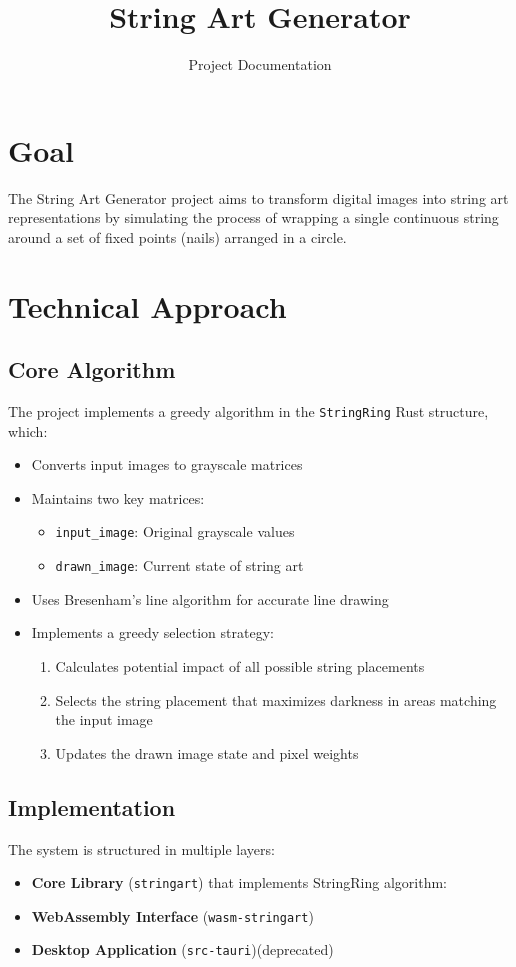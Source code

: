 \documentclass[11pt]{article}
\title{\vspace{-1.5cm}String Art Generator}
\author{Project Documentation}
\begin{document}
\maketitle

\section{Goal}
The String Art Generator project aims to transform digital images into string art representations by simulating the process of wrapping a single continuous string around a set of fixed points (nails) arranged in a circle.

\section{Technical Approach}

\subsection{Core Algorithm}
The project implements a greedy algorithm in the \texttt{StringRing} Rust structure, which:
\begin{itemize}
    \item Converts input images to grayscale matrices
    \item Maintains two key matrices:
        \begin{itemize}
            \item \texttt{input\_image}: Original grayscale values
            \item \texttt{drawn\_image}: Current state of string art
        \end{itemize}
    \item Uses Bresenham's line algorithm for accurate line drawing
    \item Implements a greedy selection strategy:
        \begin{enumerate}
            \item Calculates potential impact of all possible string placements
            \item Selects the string placement that maximizes darkness in areas matching the input image
            \item Updates the drawn image state and pixel weights
        \end{enumerate}
\end{itemize}

\subsection{Implementation}
The system is structured in multiple layers:
\begin{itemize}
    \item \textbf{Core Library} (\texttt{stringart}) that implements StringRing algorithm:
    \item \textbf{WebAssembly Interface} (\texttt{wasm-stringart})
    \item \textbf{Desktop Application} (\texttt{src-tauri})(deprecated)
\end{itemize}
\end{document}
